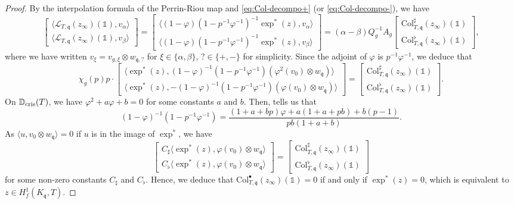 \documentclass{amsart}
\numberwithin{equation}{section}
\newcommand{\fq}{\mathfrak{q}}
\newcommand{\vp}{\varphi}
\newcommand{\col}{\mathrm{Col}}
\newcommand{\Dcris}{\mathbb{D}_{\rm cris}}
\begin{document}
\begin{proof}
By the interpolation formula of the Perrin-Riou map and \eqref{eq:Col-decompo+} (or \eqref{eq:Col-decompo-}), we have
\[
\begin{bmatrix}
    \langle \mathcal{L}_{T,\fq}(z_\infty)(\mathbb{1}),v_{\alpha}\rangle \\
    \langle \mathcal{L}_{T,\fq}(z_\infty)(\mathbb{1}),v_{\beta}\rangle
\end{bmatrix}
=\begin{bmatrix}
 \langle(1-\vp)(1-p^{-1}\vp^{-1})^{-1}\exp^*(z),v_{\alpha}\rangle \\
  \langle(1-\vp)(1-p^{-1}\vp^{-1})^{-1}\exp^*(z),v_{\beta}\rangle
\end{bmatrix}
= (\alpha-\beta)Q_g^{-1}A_g\begin{bmatrix}
    \col_{T,\fq}^{\sharp}(z_\infty)(\mathbb{1}) \\
    \col_{T,\fq}^{\flat}(z_\infty)(\mathbb{1})
\end{bmatrix},
\]
where we have written $v_\xi=v_{g,\xi}\otimes w_{\fq,?}$ for $\xi\in\{\alpha,\beta\}$, $?\in\{+,-\}$ for simplicity.
Since the adjoint of $\vp$ is $p^{-1}\vp^{-1}$, we deduce that
\[
\chi_g(p)p\cdot\begin{bmatrix}
 \langle\exp^*(z),(1-\vp)^{-1}(1-p^{-1}\vp^{-1})(\vp^2(v_0)\otimes w_\fq)\rangle \\
  \langle\exp^*(z),-(1-\vp)^{-1}(1-p^{-1}\vp^{-1})(\vp(v_0)\otimes w_\fq)\rangle
\end{bmatrix}
= \begin{bmatrix}
    \col_{T,\fq}^{\sharp}(z_\infty)(\mathbb{1}) \\
    \col_{T,\fq}^{\flat}(z_\infty)(\mathbb{1})
\end{bmatrix}.
\]
On $\Dcris(T)$, we have $\vp^2+a\vp +b =0$ for some constants $a$ and $b$. Then, \cite[proof of Lemma~5.6]{LLZ0.5} tells us that
\[
(1-\vp)^{-1}(1-p^{-1}\vp^{-1})=\frac{(1+a+bp)\vp+a(1+a+pb)+b(p-1)}{pb(1+a+b)}.
\]
As $\langle u,v_0\otimes w_\fq\rangle=0$ if $u$ is in the image of $\exp^*$, we have
\[
\begin{bmatrix}
C_\sharp\langle\exp^*(z),\vp(v_0)\otimes w_\fq\rangle \\
 C_\flat\langle\exp^*(z),\vp(v_0)\otimes w_\fq\rangle
\end{bmatrix}
= \begin{bmatrix}
    \col_{T,\fq}^{\sharp}(z_\infty)(\mathbb{1}) \\
    \col_{T,\fq}^{\flat}(z_\infty)(\mathbb{1})
\end{bmatrix}
\]
for some non-zero constants $C_\sharp$ and $C_\flat$. Hence, we deduce that $\col_{T,\fq}^{\bullet}(z_\infty)(\mathbb{1})=0$ if and only if $\exp^*(z)=0$, which is equivalent to $z\in H^1_f(K_\fq,T)$.
\end{proof}
\end{document}
